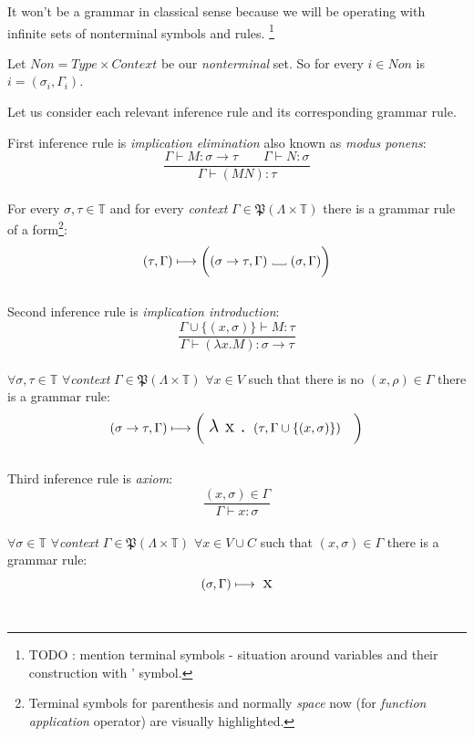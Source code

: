 \documentclass[12pt,a4paper]{report}
\newcommand{\Lets}{Let us\xspace}
\newcommand\Vtextvisiblespace[1][.3em]{%
  \mbox{\kern.06em\vrule height.3ex}%
  \vbox{\hrule width#1}%
  \hbox{\vrule height.3ex}}
\begin{document}
It won't be a grammar in classical sense because we will be operating with infinite sets of
nonterminal symbols and rules. \footnote{TODO : mention terminal symbols - situation around 
variables and their construction with ' symbol.}

Let $Non = Type \times Context $ be our {\it nonterminal} set. 
So for every $i \in Non$ is $i = (\sigma_i , \Gamma_i )$.

\Lets consider each relevant inference rule and its corresponding grammar rule.

First inference rule is {\it implication elimination} also known as 
{\it modus ponens}: 
\[
	\frac{\Gamma \vdash M : \sigma \rightarrow \tau \qquad
		  \Gamma \vdash N : \sigma }
	     {\Gamma \vdash (M N) : \tau }
\]
\\
For every $\sigma, \tau \in \mathbb{T}$ and for every {\it context} 
$\Gamma \in \mathfrak P \left({\Lambda \times  \mathbb{T}}\right)$ there is a grammar rule of a form\footnote{ 
Terminal symbols for parenthesis and normally {\it space} now \textvisiblespace \quad (for {\it function application} operator) are visually highlighted. }: 
\[	
	( \tau , \Gamma )  \longmapsto
	\bigg( ( \sigma \rightarrow \tau , \Gamma ) 
	  \mbox{ \Vtextvisiblespace[1em] } ( \sigma , \Gamma ) \bigg)
\]
\\

Second inference rule is {\it implication introduction}: 
\[
	\frac{\Gamma \cup \{ ( x,\sigma ) \} \vdash M : \tau }
	     {\Gamma \vdash (\lambda x . M) : \sigma \rightarrow \tau }
\]
\\
$\forall \sigma, \tau \in \mathbb{T}$ 
$\forall${\it context} $\Gamma \in \mathfrak P \left({\Lambda \times  \mathbb{T}}\right) $ 
$\forall x \in V $ such that there is no $(x,\rho) \in \Gamma$ 
there is a grammar rule:
\[ 
	( \sigma \rightarrow \tau , \Gamma )  \longmapsto
	\bigg( \mbox{ {\Large $\lambda$ x . }}( \tau , \Gamma \cup \{ (x,\sigma) \} ) \quad \bigg)
\]
\\	

Third inference rule is {\it axiom}: 
\[
		\frac{( x , \sigma )  \in \Gamma}
		     {\Gamma \vdash x : \sigma}
\]
\\
$\forall \sigma \in \mathbb{T}$ 
$\forall${\it context} $\Gamma \in \mathfrak P \left({\Lambda \times  \mathbb{T}}\right) $ 
$\forall x \in V \cup C $ such that $(x,\sigma) \in \Gamma$ 
there is a grammar rule:
\[ 
	( \sigma , \Gamma )  \longmapsto \mbox{ {\Large x}}
\]
\\
\end{document}
